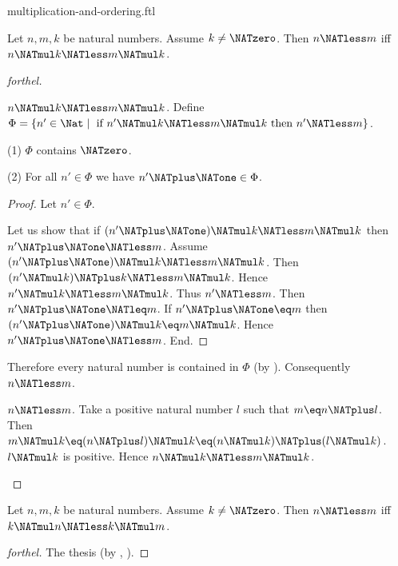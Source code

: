 \documentclass{naproche-library}
\begin{document}
\begin{smodule}[title=Multiplication and Ordering]{multiplication-and-ordering.ftl}

\begin{proposition}[forthel,id=ARITHMETIC_06_8817333933965312]
  Let $n, m, k$ be natural numbers.
  Assume $k \neq \NATzero$.
  Then $n \NATless m$ iff $n \NATmul k \NATless m \NATmul k$.
\end{proposition}
\begin{proof}[forthel]
  \begin{case}{$n \NATmul k \NATless m \NATmul k$.}
    Define $\Phi = \{ n' \in \Nat \mid\text{ if }n' \NATmul k \NATless m \NATmul k\text{ then }n' \NATless m \}$.

    (1) $\Phi$ contains $\NATzero$.

    (2) For all $n' \in \Phi$ we have $n' \NATplus \NATone \in \Phi$.
    \begin{proof}
      Let $n' \in \Phi$.

      Let us show that if $(n' \NATplus \NATone) \NATmul k \NATless m \NATmul k$ then $n' \NATplus \NATone \NATless m$.
        Assume $(n' \NATplus \NATone) \NATmul k \NATless m \NATmul k$.
        Then $(n' \NATmul k) \NATplus k \NATless m \NATmul k$.
        Hence $n' \NATmul k \NATless m \NATmul k$.
        Thus $n' \NATless m$.
        Then $n' \NATplus \NATone \NATleq m$.
        If $n' \NATplus \NATone \eq m$ then $(n' \NATplus \NATone) \NATmul k \eq m \NATmul k$.
        Hence $n' \NATplus \NATone \NATless m$.
      End.
    \end{proof}

    Therefore every natural number is contained in $\Phi$ (by ).
    Consequently $n \NATless m$.
  \end{case}

  \begin{case}{$n \NATless m$.}
    Take a positive natural number $l$ such that $m \eq n \NATplus l$.
    Then $m \NATmul k \eq (n \NATplus l) \NATmul k \eq (n \NATmul k) \NATplus (l \NATmul k)$.
    $l \NATmul k$ is positive.
    Hence $n \NATmul k \NATless m \NATmul k$.
  \end{case}
\end{proof}

\begin{corollary}[forthel,id=ARITHMETIC_06_5048640368279552]
  Let $n, m, k$ be natural numbers.
  Assume $k \neq \NATzero$.
  Then $n \NATless m$ iff $k \NATmul n \NATless k \NATmul m$.
\end{corollary}
\begin{proof}[forthel]
  The thesis (by , ).
\end{proof}


\end{smodule}
\end{document}
